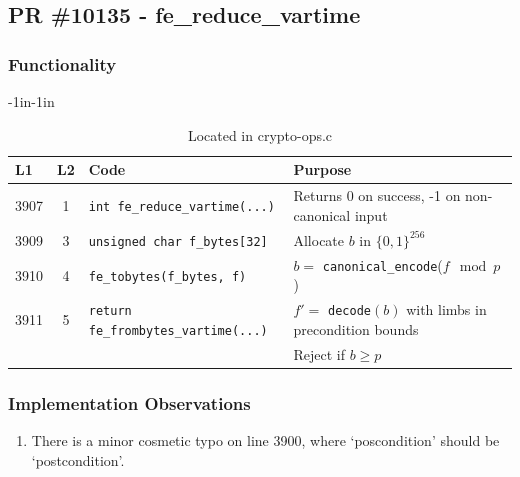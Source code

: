 \documentclass[12pt,titlepage,table]{article}
\begin{document}
\subsection{PR \#10135 - fe\_reduce\_vartime}
\subsubsection{Functionality}


\begin{table}[htbp]
\caption{fe\_reduce\_vartime Source To Spec Map}
\begin{adjustwidth}{-1in}{-1in}
\centering
{
\begin{tabular}{| l | c | l | l |}
\hline
\textbf{L1} & \textbf{L2} & \textbf{Code} & \textbf{Purpose} \\
\hline
\hline
3907 & 1 & \verb+int fe_reduce_vartime(...)+ & Returns 0 on success, -1 on non-canonical input \\
3909 & 3 & \verb+unsigned char f_bytes[32]+ & Allocate $b$ in $\{0,1\}^{256}$\\ 

3910 & 4 & \verb+fe_tobytes(f_bytes, f)+ & $b =$ \verb+canonical_encode+($f \mod p$)\\
3911 & 5 & \verb+return fe_frombytes_vartime(...)+ & $f' =$ \verb+decode+$(b)$ with limbs in precondition bounds \\
&&& Reject if $b \geq p$ \\
\hline
\end{tabular}}
\end{adjustwidth}
\caption*{Located in crypto-ops.c}
\end{table}

\subsubsection{Implementation Observations}
\begin{enumerate}
\item There is a minor cosmetic typo on line 3900, where `poscondition' should be `postcondition'.
\end{enumerate}
\newpage
\end{document}
